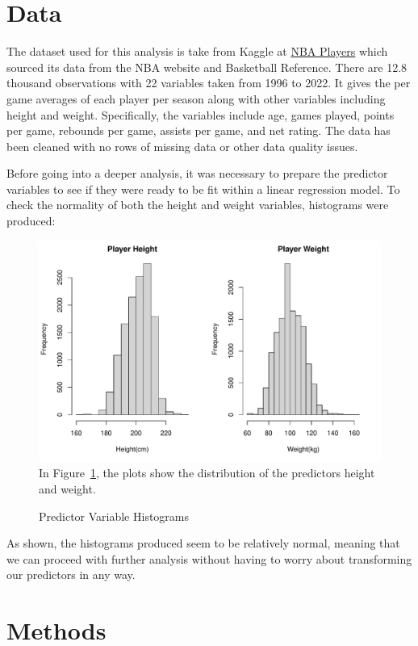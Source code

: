 \documentclass[12pt]{article}
\begin{document}
\section{Data}
\label{sec:data}

The dataset used for this analysis is take from Kaggle at \href{https://www.kaggle.com/datasets/justinas/nba-players-data}{NBA Players} 
which sourced its data from the NBA website and Basketball Reference. There are 12.8 thousand observations
with 22 variables taken from 1996 to 2022. It gives the per game averages of each player per season along with
other variables including height and weight. Specifically, the variables include age, games played, points per game,
rebounds per game, assists per game, and net rating. The data has been cleaned with no rows of missing data or
other data quality issues.

Before going into a deeper analysis, it was necessary to prepare the predictor variables to see if they were ready to
be fit within a linear regression model. To check the normality of both the height and weight variables, histograms
were produced:

\begin{figure}
	\caption{Predictor Variable Histograms}
	\includegraphics[width=1\textwidth]{predhistograms.pdf}
	\label{fig:predhistograms}
In Figure~\ref{fig:predhistograms}, the plots show the distribution of the predictors height and weight.
\end{figure}

As shown, the histograms produced seem to be relatively normal, meaning that we can proceed with further analysis
without having to worry about transforming our predictors in any way.

\section{Methods}
\label{sec:meth}
\end{document}
